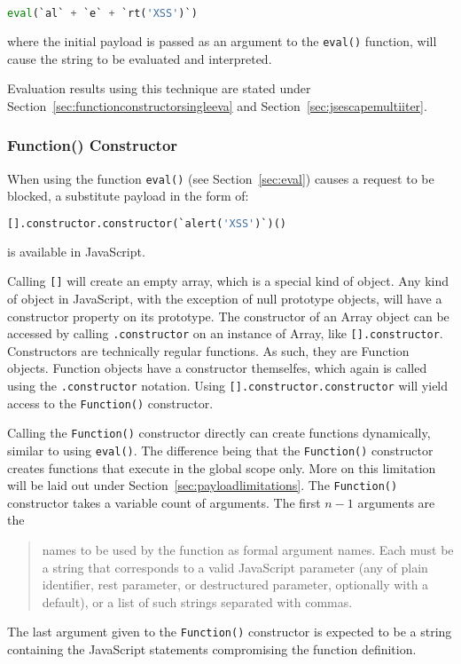 \begin{lstlisting}[style=basicStyle,language=Python]
eval(`al` + `e` + `rt('XSS')`)
\end{lstlisting}
where the initial payload is passed as an argument to the \verb|eval()| function, will cause the string to be evaluated and interpreted.

Evaluation results using this technique are stated under Section~\ref{sec:functionconstructorsingleeva} and Section~\ref{sec:jsescapemultiiter}.

\subsubsection{Function() Constructor}
\label{sec:functionconstructor}

When using the function \verb|eval()| (see Section~\ref{sec:eval}) causes a request to be blocked, a substitute payload in the form of:

\begin{lstlisting}[style=basicStyle,language=Python]
[].constructor.constructor(`alert('XSS')`)()
\end{lstlisting}
is available in JavaScript.

Calling \verb|[]| will create an empty array, which is a special kind of object.
Any kind of object in JavaScript, with the exception of null prototype objects, will have a constructor property on its prototype. \cite{js/object}
The constructor of an Array object can be accessed by calling \verb|.constructor| on an instance of Array, like \verb|[].constructor|. \cite{js/array}
Constructors are technically regular functions. As such, they are Function objects. Function objects have a constructor themselfes, which again is called using the \verb|.constructor| notation. \cite{js/constructor}
Using \verb|[].constructor.constructor| will yield access to the \verb|Function()| constructor.

Calling the \verb|Function()| constructor directly can create functions dynamically, similar to using \verb|eval()|.
The difference being that the \verb|Function()| constructor creates functions that execute in the global scope only. More on this limitation will be laid out under Section~\ref{sec:payloadlimitations}.
The \verb|Function()| constructor takes a variable count of arguments. The first $n - 1$ arguments are the
\begin{quote}
	names to be used by the function as formal argument names. Each must be a string that corresponds to a valid JavaScript parameter (any of plain identifier, rest parameter, or destructured parameter, optionally with a default), or a list of such strings separated with commas. \cite{js/function}
\end{quote}
The last argument given to the \verb|Function()| constructor is expected to be a string containing the JavaScript statements compromising the function definition. \cite{js/function}

